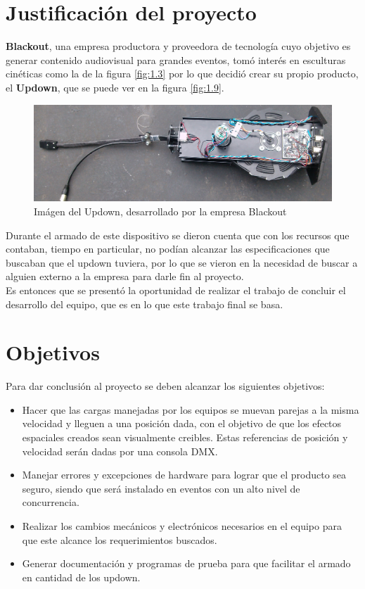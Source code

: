 \section{Justificación del proyecto}
\textbf{Blackout}, una empresa productora y proveedora de tecnología cuyo objetivo es generar contenido audiovisual para grandes eventos, tomó interés en esculturas cinéticas como la de la figura \ref{fig:1.3} por lo que decidió crear su propio producto, el \textbf{Updown}, que se puede ver en la figura \ref{fig:1.9}. \\

\begin{figure}[!ht]
	\centering
	\includegraphics[width=15cm,scale=1]{resources/1_9-updown.jpg}
	\caption{Imágen del Updown, desarrollado por la empresa Blackout}
	\label{fig:\thefigure}
\end{figure}

Durante el armado de este dispositivo se dieron cuenta que con los recursos que contaban, tiempo en particular, no podían alcanzar las especificaciones que buscaban que el updown tuviera, por lo que se vieron en la necesidad de buscar a alguien externo a la empresa para darle fin al proyecto.\\

Es entonces que se presentó la oportunidad de realizar el trabajo de concluir el desarrollo del equipo, que es en lo que este trabajo final se basa.

\newpage
\section{Objetivos}
Para dar conclusión al proyecto se deben alcanzar los siguientes objetivos:
\begin{itemize}
	\item Hacer que las cargas manejadas por los equipos se muevan parejas a la misma velocidad y lleguen a una posición dada, con el objetivo de que los efectos espaciales creados sean visualmente creibles. Estas referencias de posición y velocidad serán dadas por una consola DMX.
	\item Manejar errores y excepciones de hardware para lograr que el producto sea seguro, siendo que será instalado en eventos con un alto nivel de concurrencia.
	\item Realizar los cambios mecánicos y electrónicos necesarios en el equipo para que este alcance los requerimientos buscados.
	\item Generar documentación y programas de prueba para que facilitar el armado en cantidad de los updown.
	
\end{itemize}


